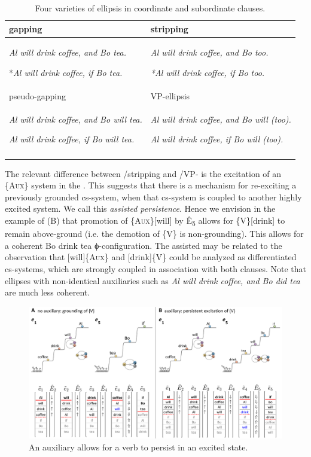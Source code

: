   
  
\begin{table}
\begin{tabularx}{\textwidth}{XX}
\lsptoprule
{gapping} & {stripping}\\
\midrule 

\textit{Al will drink coffee, and Bo tea.}

*\textit{Al will drink coffee, if Bo tea.} & \textit{Al will drink coffee, and Bo too.}

\textit{*Al will drink coffee, if Bo too.}  \\
\midrule
{pseudo-gapping} & {VP-ellipsis}\\
\midrule 
\textit{Al will drink coffee, and Bo will tea.}

\textit{Al will drink coffee, if Bo will tea.} & \textit{Al will drink coffee, and Bo will (too).}

\textit{Al will drink coffee, if Bo will (too).}\\
\lspbottomrule
\end{tabularx}
\caption{Four varieties of ellipsis in coordinate and subordinate clauses.}\label{tab:7:1}
\end{table}

  The relevant difference between /stripping and /VP- is the excitation of an \{A\textsc{ux}\} system in the . This suggests that there is a mechanism for re-exciting a previously grounded cs-system, when that cs-system is coupled to another highly excited system. We call this \textit{assisted persistence}. Hence we envision in the  example of {}(B) that promotion of \{A\textsc{ux}\}[will] by Ê\textsubscript{5} allows for \{V\}[drink] to remain above-ground (i.e. the demotion of \{V\} is non-grounding). This allows for a coherent {\textbar}Bo drink tea{\textbar} ϕ-con\-fig\-u\-ra\-tion. The assisted  may be related to the observation that [will]\{A\textsc{ux}\} and [drink]\{V\} could be analyzed as differentiated cs-systems, which are strongly coupled in association with both clauses. Note that ellipses with non-identical auxiliaries such as \textit{Al will drink coffee, and Bo did tea} are much less coherent.

  
\begin{figure}
\includegraphics[width=\textwidth]{figures/Tilsen-img147.png}
\caption{An auxiliary allows for a verb to persist in an excited state.}
\label{fig:7:3}
\end{figure}
 \clearpage

